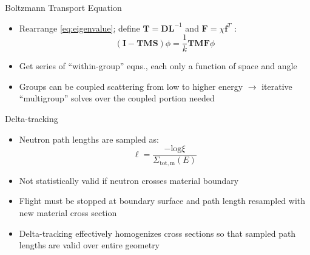 \documentclass[final]{beamer}
\newcommand{\ve}[1]{\ensuremath{\mathbf{#1}}}
\begin{document}
\begin{frame}{}
\begin{columns}[t]
\begin{column}{.3\linewidth}
\begin{block}{\large Boltzmann Transport Equation}
\begin{itemize}
	 		\item{Rearrange \eqref{eq:eigenvalue}; define $\ve{T} = \ve{DL}^{-1}$ 
	 		 and $\ve{F} = \chi \ve{f}^{T}$ \cite{denovo}}:
            \begin{equation}
              (\ve{I} - \ve{TMS})\phi = \frac{1}{k} \ve{TMF} \phi
              \label{eq:OperatorEvalForm}
            \end{equation}

            \item{Get series of ``within-group'' eqns., each only a function of space
             and angle}
            \item{Groups can be coupled scattering from low to higher energy $\rightarrow$
             iterative ``multigroup'' solves over the coupled portion needed}
			\end{itemize}
    			\end{block}
    	\vfill
        	\begin{block}{\large Delta-tracking}
		\begin{itemize}
		\item{Neutron path lengths are sampled as:}
			\begin{equation*}
			\ell = \frac{-\mathrm{log}\xi}{\Sigma_{\mathrm{tot,m}}(E)}
			\end{equation*}
		\item{Not statistically valid if neutron crosses material boundary}
		\item{Flight must be stopped at boundary surface and path length resampled with new material cross section}
		\item{Delta-tracking effectively homogenizes cross sections so that sampled path lengths are valid over entire geometry \cite{serpent}}
		\end{itemize}
        	\end{block}
    	\end{column}



\end{columns}
\end{frame}
\end{document}

